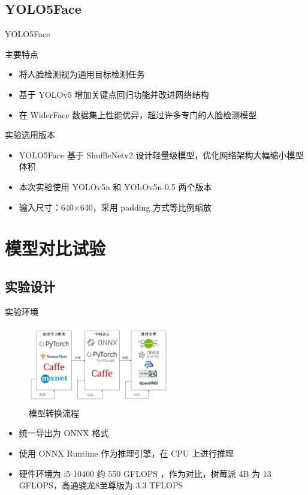 \documentclass{beamer}
\begin{document}
\subsection{YOLO5Face}
\begin{frame}{YOLO5Face}
    \begin{block}{主要特点}
        \begin{itemize}
            \item 将人脸检测视为通用目标检测任务
            \item 基于 YOLOv5 增加关键点回归功能并改进网络结构
            \item 在 WiderFace 数据集上性能优异，超过许多专门的人脸检测模型
        \end{itemize}
    \end{block}
    
    \begin{block}{实验选用版本}
        \begin{itemize}
            \item YOLO5Face 基于 ShuffleNetv2 设计轻量级模型，优化网络架构大幅缩小模型体积
            \item 本次实验使用 YOLOv5n 和 YOLOv5n-0.5 两个版本
            \item 输入尺寸：640$\times$640，采用 padding 方式等比例缩放
        \end{itemize}
    \end{block}
\end{frame}

\section{模型对比试验}

\subsection{实验设计}
\begin{frame}{实验环境}

    \begin{figure}[h]
        \centering
        \includegraphics[width=0.55\textwidth]{pic/pipeline.jpg}
        \caption{模型转换流程}
    \end{figure}
    \begin{itemize}
        \item 统一导出为 ONNX 格式
        \item 使用 ONNX Runtime 作为推理引擎，在 CPU 上进行推理
        \item 硬件环境为 i5-10400 约 550 GFLOPS ，作为对比，树莓派 4B 为 13 GFLOPS，高通骁龙8至尊版为 3.3 TFLOPS
    \end{itemize}
\end{frame}
\end{document}
